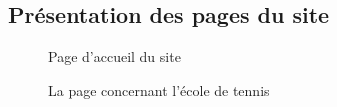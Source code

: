 \documentclass{article}[12pt]
\begin{document}
\subsection{Présentation des pages du site}
\begin{figure}[H]
	\centering    {}
    \caption{Page d'accueil du site}
\end{figure}
 \begin{figure}[H]
     	\centering
     	\caption{La page concernant l'école de tennis}
     \end{figure}
\end{document}
